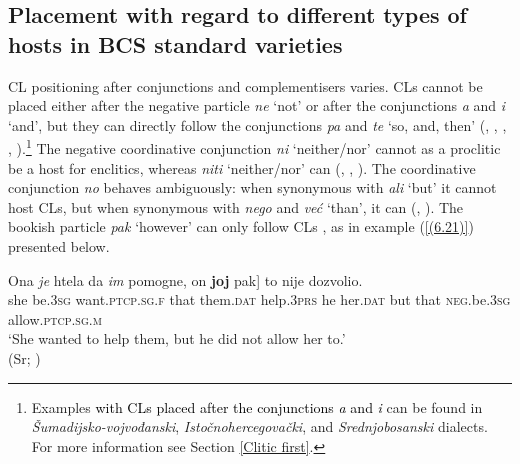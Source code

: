 \subsection{Placement with regard to different types of hosts in BCS standard varieties}
\label{Placement with regard to different types of hosts in BCS standard varieties}
CL positioning after conjunctions and complementisers varies. CLs cannot be placed either after the negative particle \textit{ne} ‘not’ or after the conjunctions \textit{a} and \textit{i} ‘and’, but they can directly follow the conjunctions \textit{pa} and \textit{te} ‘so, and, then’ (\citealt[cf.][595]{Baric97}, \citealt[471]{JHP00}, \citealt[371]{StanojcicPopovic02}, \citealt[297]{Popovic04}, \citealt[451]{PiperKlajn14}).\footnote{Examples \textcolor{black}{with CLs placed after the conjunctions \textit{a} and \textit{i}} can be found in \textit{Šumadijsko-vojvođanski}, \textit{Istočnohercegovački}, and \textit{Srednjobosanski} dialects. For more information see Section \ref{Clitic first}.} The negative coordinative conjunction \textit{ni} ‘neither/nor’ cannot as a proclitic be a host for enclitics, whereas \textit{niti} ‘neither/nor’ can (\citealt[cf.][537, 562]{Ridjanovic12}, \citealt[297]{Popovic04}, \citealt[451]{PiperKlajn14}). The coordinative conjunction \textit{no} behaves ambiguously: when synonymous with \textit{ali} ‘but’ it cannot host CLs, but when synonymous with \textit{nego} and \textit{već} ‘than’, it can (\citealt[cf.][371]{StanojcicPopovic02}, \citealt[298]{Popovic04}). The bookish particle \textit{pak} ‘however’ can only follow CLs \citep[cf.][451]{PiperKlajn14}, as in example (\ref{(6.21)}) presented below.

\begin{exe}\ex\label{(6.21)}
\gll Ona \textit{je} htela da \textit{im} pomogne, on \textbf{joj} \minsp{[} pak] to nije dozvolio. \\
 she be\textsc{.3sg} want\textsc{.ptcp.sg.f} that them\textsc{.dat} help\textsc{.3prs} he her\textsc{.dat} {} but that \textsc{neg.}be\textsc{.3sg} allow\textsc{.ptcp.sg.m}\\
\glt ‘She wanted to help them, but he did not allow her to.’ \\
\hfill (Sr; \citealt[][451]{PiperKlajn14})
\end{exe}

